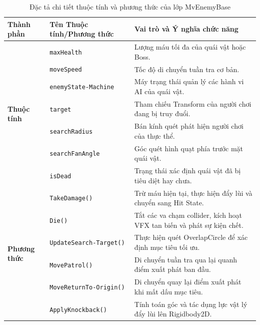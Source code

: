 \documentclass[../DoAn.tex]{subfiles}
\begin{document}
\begin{table}[H]
\centering
\begin{tabular}{|p{2.2cm}|p{4.8cm}|p{8.0cm}|}
\hline
\textbf{Thành phần} & \textbf{Tên Thuộc tính/Phương thức} & \textbf{Vai trò và Ý nghĩa chức năng} \\ \hline
\multirow{7}{*}{\textbf{Thuộc tính}} & \texttt{maxHealth} & Lượng máu tối đa của quái vật hoặc Boss. \\ \cline{2-3}
 & \texttt{moveSpeed} & Tốc độ di chuyển tuần tra cơ bản. \\ \cline{2-3}
 & \texttt{enemyState-}\newline\texttt{Machine} & Máy trạng thái quản lý các hành vi AI của quái vật. \\ \cline{2-3}
 & \texttt{target} & Tham chiếu Transform của người chơi đang bị truy đuổi. \\ \cline{2-3}
 & \texttt{searchRadius} & Bán kính quét phát hiện người chơi của thực thể. \\ \cline{2-3}
 & \texttt{searchFanAngle} & Góc quét hình quạt phía trước mặt quái vật. \\ \cline{2-3}
 & \texttt{isDead} & Trạng thái xác định quái vật đã bị tiêu diệt hay chưa. \\ \hline
\multirow{6}{*}{\textbf{Phương thức}} & \texttt{TakeDamage()} & Trừ máu hiện tại, thực hiện đẩy lùi và chuyển sang Hit State. \\ \cline{2-3}
 & \texttt{Die()} & Tắt các va chạm collider, kích hoạt VFX tan biến và phát sự kiện chết. \\ \cline{2-3}
 & \texttt{UpdateSearch-}\newline\texttt{Target()} & Thực hiện quét OverlapCircle để xác định mục tiêu tối ưu. \\ \cline{2-3}
 & \texttt{MovePatrol()} & Di chuyển tuần tra qua lại quanh điểm xuất phát ban đầu. \\ \cline{2-3}
 & \texttt{MoveReturnTo-}\newline\texttt{Origin()} & Di chuyển quay lại điểm xuất phát khi mất dấu mục tiêu. \\ \cline{2-3}
 & \texttt{ApplyKnockback()} & Tính toán góc và tác dụng lực vật lý đẩy lùi lên Rigidbody2D. \\ \hline
\end{tabular}
\caption{Đặc tả chi tiết thuộc tính và phương thức của lớp MvEnemyBase}
\label{table:enemy_base_details}
\end{table}
\end{document}
